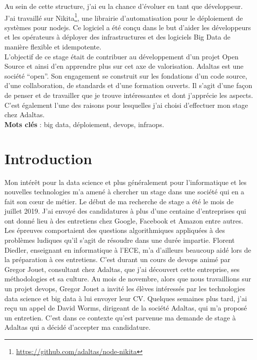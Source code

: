 \documentclass[12pt, french]{report}
\begin{document}
Au sein de cette structure, j'ai eu la chance d'évoluer en tant que développeur. J'ai travaillé sur Nikita\footnote{\href{https://github.com/adaltas/node-nikita}{https://github.com/adaltas/node-nikita}}, une librairie d’automatisation pour le déploiement de systèmes pour \gls{nodejs}. Ce logiciel a été conçu dans le but d'aider les développeurs et les opérateurs à déployer des infrastructures et des logiciels Big Data de manière flexible et idempotente.\\

L'objectif de ce stage était de contribuer au développement d'un projet Open Source et ainsi d'en apprendre plus sur cet axe de valorisation. Adaltas est une société “open”. Son engagement se construit sur les fondations d’un code source, d’une collaboration, de standards et d’une formation ouverts. Il s'agit d'une façon de penser et de travailler que je trouve intéressantes et dont j'apprécie les aspects. C'est également l'une des raisons pour lesquelles j'ai choisi d'effectuer mon stage chez Adaltas.\\

\noindent\textbf{Mots clés} : big data, déploiement, devops, infraops.

\newpage
\thispagestyle{empty}
\mbox{}
\newpage

\begingroup
\hypersetup{linkcolor=black}
\listoffigures
\tableofcontents
\newpage
\endgroup

\chapter*{Introduction}

Mon intérêt pour la data science et plus généralement pour l’informatique et les nouvelles technologies m’a amené à chercher un stage dans une société qui en a fait son cœur de métier. Le début de ma recherche de stage a été le mois de juillet 2019. J'ai envoyé des candidatures à plus d'une centaine d'entreprises qui ont donné lieu à des entretiens chez Google, Facebook et Amazon entre autres. Les épreuves comportaient des questions algorithmiques appliquées à des problèmes ludiques qu'il s'agit de résoudre dans une durée impartie. Florent Diedler, enseignant en informatique à l'ECE, m'a d'ailleurs beaucoup aidé lors de la préparation à ces entretiens. C'est durant un cours de \gls{devops} animé par Gregor Jouet, consultant chez Adaltas, que j'ai découvert cette entreprise, ses méthodologies et sa culture. Au mois de novembre, alors que nous travaillions sur un projet \gls{devops}, Gregor Jouet a invité les élèves intéressés par les technologies data science et big data à lui envoyer leur CV. Quelques semaines plus tard, j'ai reçu un appel de David Worms, dirigeant de la société Adaltas, qui m'a proposé un entretien. C'est dans ce contexte qu'est parvenue ma demande de stage à Adaltas qui a décidé d'accepter ma candidature.\\
\end{document}
